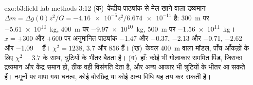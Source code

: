 \begin{solution}{exo:b3:field-lab-methods-3:12}
(क)~केंद्रीय पाठ्यांक से मेल खाने वाला द्रव्यमान $\Delta m = \Delta g(0)z^2/G
= \num{-4.16e-5}z^2/\num{6.674e-11}$ है: \qty{300}{m} पर \qty{-5.61e10}{kg},
\qty{400}{m} पर \qty{-9.97e10}{kg}, \qty{500}{m} पर \qty{-1.56e11}{kg}।
$x = \pm300$ और $\pm600$ पर अनुमानित पाठ्यांक
\num{-1.47} और \num{-0.37}, \num{-2.13} और \num{-0.71}, \num{-2.62}
और \qty{-1.09}{\milli\gal} हैं।  $\chi^2 = 1238$, $3.7$ और
$856$ हैं। (ख)~केवल \qty{400}{m} वाला मॉडल, पाँच आँकड़ों के लिए $\chi^2 = 3.7$ के साथ, त्रुटियों के भीतर बैठता है।
(ग)~हाँ: कोई भी गोलाकार सममित पिंड, जिसका द्रव्यमान और केंद्र समान हो, ठीक वही विसंगति देता है,
और अन्य आकार भी त्रुटियों के भीतर आ सकते हैं। नमूनों पर मापा गया घनत्व,
कोई बोरछिद्र या कोई अन्य विधि
यह तय कर सकती है।
\end{solution}

